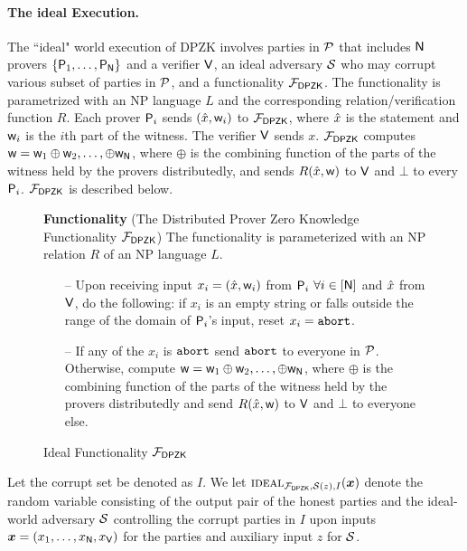 \paragraph{The ideal Execution.} The ``ideal" world execution of DPZK  involves parties in $\mathcal{P}$ that includes $\mathsf{N}$ provers $\{\mathsf{P}_1, \ldots, \mathsf{P}_{\mathsf{N}}\}$ and a verifier $\mathsf{V}$,  an ideal adversary $\mathcal{S}$ who may corrupt various subset of parties in $\mathcal{P}$, and a  functionality $\mathcal{F}_{\mathsf{DPZK}}$.  The functionality is parametrized with an  NP language $L$ and  the corresponding relation/verification function $R$. Each prover $\mathsf{P}_i$ sends $(\hat{x},\mathsf{w}_i)$ to $\mathcal{F}_{\mathsf{DPZK}}$, where $\hat{x}$ is the statement and $\mathsf{w}_i$ is the $i$th part of the witness. The verifier $\mathsf{V}$ sends $x$.  $\mathcal{F}_{\mathsf{DPZK}}$ computes $\mathsf{w} = \mathsf{w}_1 \oplus \mathsf{w}_2,\ldots,\oplus \mathsf{w}_{\mathsf{N}}$, where $\oplus$ is the combining function of the parts of the witness held by the provers distributedly, and sends $R(\hat{x},\mathsf{w})$ to $\mathsf{V}$ and $\bot$ to every $\mathsf{P}_i$. $\mathcal{F}_{\mathsf{DPZK}}$  is described below. 
\begin{figure}[H]
	\centering
	\begin{framed}
		\textbf{Functionality} (The Distributed Prover Zero Knowledge Functionality $\mathcal{F}_{\mathsf{DPZK}}$)
		The functionality is parameterized with an NP relation $R$ of an NP language $L$.
		\begin{itemize}
		\item[--] Upon receiving input $x_i = (\hat{x}, \mathsf{w}_i)$ from $\mathsf{P}_i$ $\forall i\in[\mathsf{N}]$ and $\hat{x}$ from $\mathsf{V}$, do the following: if $x_i$ is an empty string or falls outside the range of the domain of $\mathsf{P}_i$'s input,  reset $x_i = \texttt{abort}$. 
			\item[--] If any of the $x_i$ is $\texttt{abort}$ send $\texttt{abort}$ to everyone in $\mathcal{P}$. Otherwise,   compute $\mathsf{w} = \mathsf{w}_1 \oplus \mathsf{w}_2,\ldots, \oplus \mathsf{w}_{\mathsf{N}}$, where $\oplus$ is the combining function of the parts of the witness held by the provers distributedly and send $R(\hat{x}, \mathsf{w})$ to $\mathsf{V}$ and $\bot$ to everyone else. 
		\end{itemize}
	\end{framed}
	\caption{Ideal Functionality $\mathcal{F}_{\mathsf{DPZK}}$}
\end{figure} \label{func:DPZK}

Let the corrupt set be denoted as $I$. We let $\Ideal_{\Func_\DPZK, \Sim(z),I}(\vec{x})$ denote the random variable consisting of the output pair of the honest parties and the ideal-world adversary $\mathcal{S}$ controlling the corrupt parties in $I$ upon inputs $\vec{x} = (x_1  ,\ldots,x_{\Num},x_\verifier)$ for the parties and auxiliary input $z$ for $\mathcal{S}$.  


